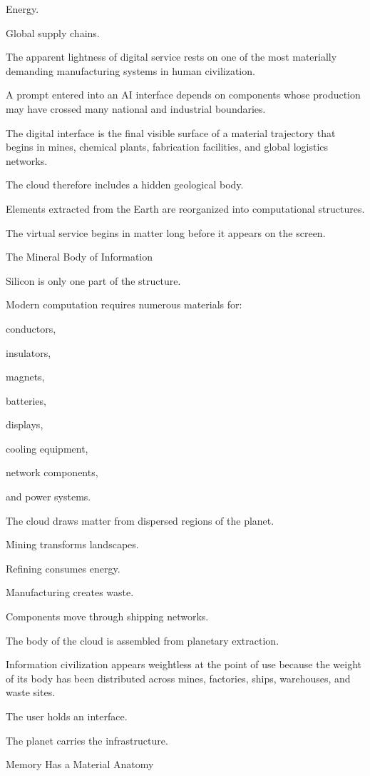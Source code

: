 Energy.

Global supply chains.

The apparent lightness of digital service rests on one of the most materially demanding manufacturing systems in human civilization.

A prompt entered into an AI interface depends on components whose production may have crossed many national and industrial boundaries.

The digital interface is the final visible surface of a material trajectory that begins in mines, chemical plants, fabrication facilities, and global logistics networks.

The cloud therefore includes a hidden geological body.

Elements extracted from the Earth are reorganized into computational structures.

The virtual service begins in matter long before it appears on the screen.

The Mineral Body of Information

Silicon is only one part of the structure.

Modern computation requires numerous materials for:

conductors,

insulators,

magnets,

batteries,

displays,

cooling equipment,

network components,

and power systems.

The cloud draws matter from dispersed regions of the planet.

Mining transforms landscapes.

Refining consumes energy.

Manufacturing creates waste.

Components move through shipping networks.

The body of the cloud is assembled from planetary extraction.

Information civilization appears weightless at the point of use because the weight of its body has been distributed across mines, factories, ships, warehouses, and waste sites.

The user holds an interface.

The planet carries the infrastructure.

Memory Has a Material Anatomy


